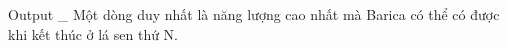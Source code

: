 Output
\_ Một dòng duy nhất là năng lượng cao nhất mà Barica có thể có được khi kết thúc ở lá sen thứ N.